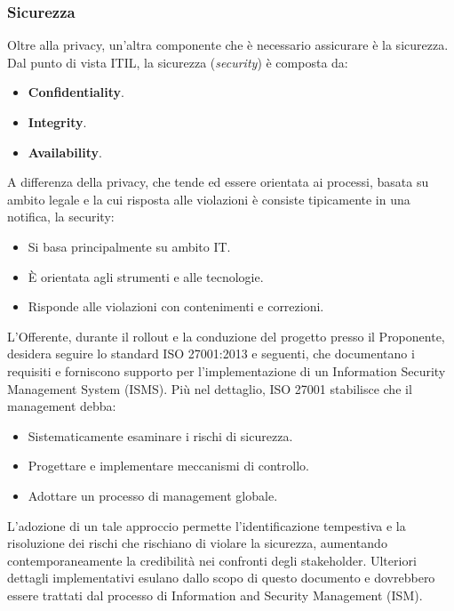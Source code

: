 					\subsubsection{Sicurezza}
						Oltre alla privacy, un'altra componente che è necessario assicurare è la sicurezza. Dal punto di vista ITIL, la sicurezza (\textit{security}) è composta da:
                        \begin{itemize}
                        	\item \textbf{Confidentiality}.
                            \item \textbf{Integrity}.
                            \item \textbf{Availability}.
                        \end{itemize}
                        A differenza della privacy, che tende ed essere orientata ai processi, basata su ambito legale e la cui risposta alle violazioni è consiste tipicamente in una notifica, la security:
                        \begin{itemize}
                        	\item Si basa principalmente su ambito IT.
                            \item È orientata agli strumenti e alle tecnologie.
                            \item Risponde alle violazioni con contenimenti e correzioni.
                        \end{itemize}
                        L'Offerente, durante il rollout e la conduzione del progetto presso il Proponente, desidera seguire lo standard ISO 27001:2013 e seguenti, che documentano i requisiti e forniscono supporto per l'implementazione di un Information Security Management System (ISMS). Più nel dettaglio, ISO 27001 stabilisce che il management debba:
                        \begin{itemize}
                        	\item Sistematicamente esaminare i rischi di sicurezza.
                            \item Progettare e implementare meccanismi di controllo.
                            \item Adottare un processo di management globale.
                        \end{itemize}
                        L'adozione di un tale approccio permette l'identificazione tempestiva e la risoluzione dei rischi che rischiano di violare la sicurezza, aumentando contemporaneamente la credibilità nei confronti degli stakeholder.
                        Ulteriori dettagli implementativi esulano dallo scopo di questo documento e dovrebbero essere trattati dal processo di Information and Security Management (ISM).

